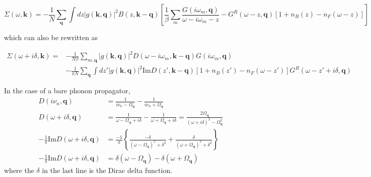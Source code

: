 \documentclass[]{article}
\newcommand{\kk}{\mathbf{k}}
\newcommand{\qq}{\mathbf{q}}
\newcommand{\iwm}{i\omega_m}
\newcommand{\gs}{\left| g(\mathbf{k}, \mathbf{q}) \right|^2}
\newcommand{\ivn}{i\nu_n}
\begin{document}
\begin{equation}
\boxed{
\Sigma(\omega, \kk) = -\frac{1}{N} \sum_{\qq} \int dz \gs B(z,\kk-\qq) \left[ \frac{1}{\beta} \sum_m \frac{G(\iwm,\qq)}{\omega-\iwm-z} - G^R(\omega-z,\qq) \left[ 1 + n_B(z) - n_F(\omega-z) \right] \right] }
\end{equation}

which can also be rewritten as

\begin{equation}
\label{3}
\boxed{
\begin{split}
\Sigma(\omega+i\delta, \kk) = &-\frac{1}{N\beta} \sum_{m,\qq} \gs D(\omega-\iwm,\kk-\qq)G(\iwm,\qq) \\
& - \frac{1}{\pi N} \sum_\qq \int dz' \gs \mathrm{Im} D(z',\kk-\qq)\left[ 1 + n_B(z') - n_F(\omega-z')\right]G^R(\omega-z'+i\delta,\qq)
\end{split}}
\end{equation}


In the case of a bare phonon propagator,
\begin{equation}
\begin{split}
D(\ivn,\qq) &= \frac{1}{\ivn-\Omega_\qq} - \frac{1}{\ivn+\Omega_\qq} \\
D(\omega+i\delta,\qq) &= \frac{1}{\omega-\Omega_\qq+i\delta} - \frac{1}{\omega+\Omega_\qq+i\delta} = \frac{2\Omega_\qq}{(\omega+i\delta)^2-\Omega_\qq^2} \\
-\frac{1}{\pi} \mathrm{Im} D(\omega+i\delta,\qq) &= \frac{-1}{\pi}\left\lbrace \frac{-\delta}{(\omega-\Omega_\qq)^2+\delta^2} + \frac{\delta}{(\omega+\Omega_\qq)^2+\delta^2}  \right\rbrace \\
-\frac{1}{\pi} \mathrm{Im} D(\omega+i\delta,\qq) &= \delta(\omega-\Omega_\qq) - \delta(\omega+\Omega_\qq)
\end{split}
\end{equation}
where the $\delta$ in the last line is the Dirac delta function.
\end{document}
